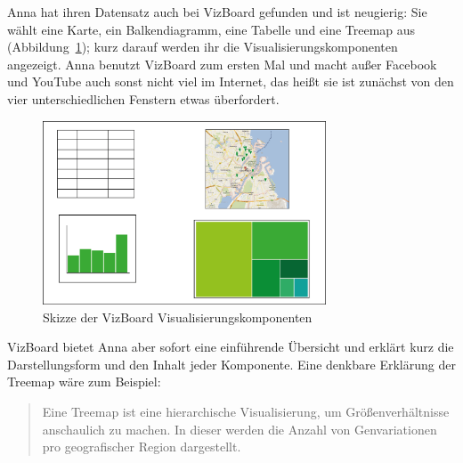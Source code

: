 \documentclass[
	headsepline,
	footsepline,
	fontsize=12pt,
	bibliography=totoc
]{scrbook}
\begin{document}

Anna hat ihren Datensatz auch bei VizBoard gefunden und ist neugierig: Sie wählt eine Karte, ein Balkendiagramm, eine Tabelle und eine Treemap aus (Abbildung~\ref{figure:szenario-skizze}); kurz darauf werden ihr die Visualisierungskomponenten angezeigt. Anna benutzt VizBoard zum ersten Mal und macht außer Facebook und YouTube auch sonst nicht viel im Internet, das heißt sie ist zunächst von den vier unterschiedlichen Fenstern etwas überfordert.

\begin{figure}[htbp]
	\centering
	\includegraphics[width=0.75\textwidth]{images/szenario-skizze.png}
	\caption{Skizze der VizBoard Visualisierungskomponenten}
	\label{figure:szenario-skizze}
\end{figure}

VizBoard bietet Anna aber sofort eine einführende Übersicht und erklärt kurz die Darstellungsform und den Inhalt jeder Komponente. Eine denkbare Erklärung der Treemap wäre zum Beispiel:

\begin{quote}
Eine Treemap ist eine hierarchische Visualisierung, um Größenverhältnisse anschaulich zu machen. In dieser werden die Anzahl von Genvariationen pro geografischer Region dargestellt.
\end{quote}

\end{document}
